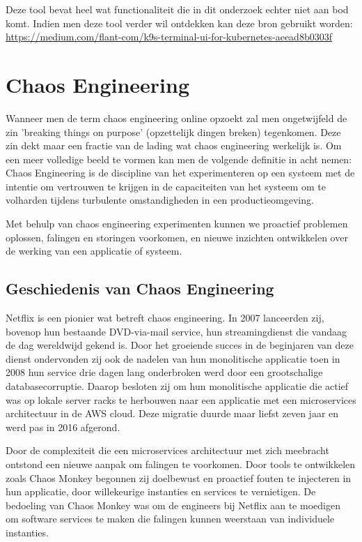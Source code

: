 Deze tool bevat heel wat functionaliteit die in dit onderzoek echter niet aan bod komt. Indien men deze tool verder wil ontdekken kan deze bron gebruikt worden: \url{https://medium.com/flant-com/k9s-terminal-ui-for-kubernetes-aeead8b0303f}

\section{Chaos Engineering}
\label{ch:chaos}

Wanneer men de term chaos engineering online opzoekt zal men ongetwijfeld de zin 'breaking things on purpose' (opzettelijk dingen breken) tegenkomen. Deze zin dekt maar een fractie van de lading wat chaos engineering werkelijk is. Om een meer volledige beeld te vormen kan men de volgende definitie in acht nemen: Chaos Engineering is de discipline van het experimenteren op een systeem met de intentie om vertrouwen te krijgen in de capaciteiten van het systeem om te volharden tijdens turbulente omstandigheden in een productieomgeving. \autocite{Eliot2019}

Met behulp van chaos engineering experimenten kunnen we proactief problemen oplossen, falingen en storingen voorkomen, en nieuwe inzichten ontwikkelen over de werking van een applicatie of systeem.  

\subsection{Geschiedenis van Chaos Engineering}

Netflix is een pionier wat betreft chaos engineering. In 2007 lanceerden zij, bovenop hun bestaande DVD-via-mail service, hun streamingdienst die vandaag de dag wereldwijd gekend is. Door het groeiende succes in de beginjaren van deze dienst ondervonden zij ook de nadelen van hun monolitische applicatie toen in 2008 hun service drie dagen lang onderbroken werd door een grootschalige databasecorruptie. 
Daarop besloten zij om hun monolitische applicatie die actief was op lokale server racks te herbouwen naar een applicatie met een microservices architectuur in de AWS cloud. Deze migratie duurde maar liefst zeven jaar en werd pas in 2016 afgerond.

Door de complexiteit die een microservices architectuur met zich meebracht ontstond een nieuwe aanpak om falingen te voorkomen. Door tools te ontwikkelen zoals Chaos Monkey begonnen zij doelbewust en proactief fouten te injecteren in hun applicatie, door willekeurige instanties en services te vernietigen. De bedoeling van Chaos Monkey was om de engineers bij Netflix aan te moedigen om software services te maken die falingen kunnen weerstaan van individuele instanties. \autocite{Basiri2016}  

